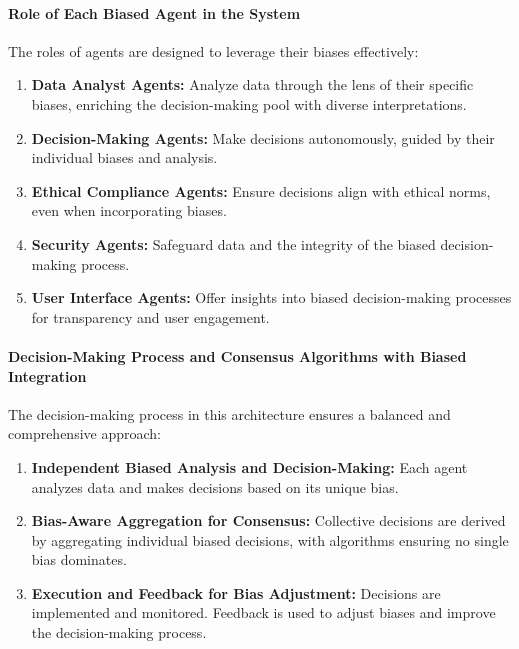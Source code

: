 \documentclass{article}
\begin{document}
\hypertarget{role-of-each-biased-agent-in-the-system}{%
\paragraph{Role of Each Biased Agent in the
System}\label{role-of-each-biased-agent-in-the-system}}

The roles of agents are designed to leverage their biases effectively:

\begin{enumerate}
\def\labelenumi{\arabic{enumi}.}
\item
  \textbf{Data Analyst Agents:} Analyze data through the lens of their
  specific biases, enriching the decision-making pool with diverse
  interpretations.
\item
  \textbf{Decision-Making Agents:} Make decisions autonomously, guided
  by their individual biases and analysis.
\item
  \textbf{Ethical Compliance Agents:} Ensure decisions align with
  ethical norms, even when incorporating biases.
\item
  \textbf{Security Agents:} Safeguard data and the integrity of the
  biased decision-making process.
\item
  \textbf{User Interface Agents:} Offer insights into biased
  decision-making processes for transparency and user engagement.
\end{enumerate}

\hypertarget{decision-making-process-and-consensus-algorithms-with-biased-integration}{%
\paragraph{Decision-Making Process and Consensus Algorithms with Biased
Integration}\label{decision-making-process-and-consensus-algorithms-with-biased-integration}}

The decision-making process in this architecture ensures a balanced and
comprehensive approach:

\begin{enumerate}
\def\labelenumi{\arabic{enumi}.}
\item
  \textbf{Independent Biased Analysis and Decision-Making:} Each agent
  analyzes data and makes decisions based on its unique bias.
\item
  \textbf{Bias-Aware Aggregation for Consensus:} Collective decisions
  are derived by aggregating individual biased decisions, with
  algorithms ensuring no single bias dominates.
\item
  \textbf{Execution and Feedback for Bias Adjustment:} Decisions are
  implemented and monitored. Feedback is used to adjust biases and
  improve the decision-making process.
\end{enumerate}
\end{document}
